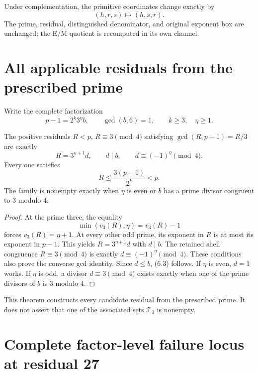 Under complementation, the primitive coordinates change exactly by
\[
 (h,r,s)\longmapsto(h,s,r).                                     \tag{5.8}
\]
The prime, residual, distinguished denominator, and original exponent box are
unchanged; the E/M quotient is recomputed in its own channel.

\section{All applicable residuals from the prescribed prime}

Write the complete factorization
\[
 p-1=2^k3^\eta b,\qquad \gcd(b,6)=1,\qquad k\ge3,\quad\eta\ge1. \tag{6.1}
\]

\begin{theorem}\label{thm:residuals}
The positive residuals $R<p$, $R\equiv3\pmod4$ satisfying
$\gcd(R,p-1)=R/3$ are exactly
\[
 \boxed{R=3^{\eta+1}d,\qquad d\mid b,\qquad
 d\equiv(-1)^\eta\pmod4.}                                     \tag{6.2}
\]
Every one satisfies
\[
 R\le\frac{3(p-1)}{2^k}<p.                                    \tag{6.3}
\]
The family is nonempty exactly when $\eta$ is even or $b$ has a prime divisor
congruent to $3$ modulo $4$.
\end{theorem}

\begin{proof}
At the prime three, the equality
\[
 \min(v_3(R),\eta)=v_3(R)-1
\]
forces $v_3(R)=\eta+1$.  At every other odd prime, its exponent in $R$ is at
most its exponent in $p-1$.  This yields $R=3^{\eta+1}d$ with $d\mid b$.
The retained shell congruence $R\equiv3\pmod4$ is exactly
$d\equiv(-1)^\eta\pmod4$.  These conditions also prove the converse gcd
identity.  Since $d\le b$, (6.3) follows.  If $\eta$ is even, $d=1$ works.  If
$\eta$ is odd, a divisor $d\equiv3\pmod4$ exists exactly when one of the prime
divisors of $b$ is $3$ modulo $4$.
\end{proof}

This theorem constructs every candidate residual from the prescribed prime.
It does not assert that one of the associated sets $\mathcal T_3$ is nonempty.

\section{Complete factor-level failure locus at residual 27}

